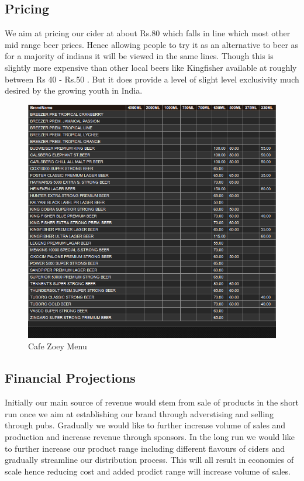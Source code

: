 \documentclass[11pt]{article}
\begin{document}
	\subsection{Pricing}
	We aim at pricing our cider at about Rs.80 which falls in line which most other mid range beer prices. Hence allowing people to try it as an alternative to beer as for a majority of indians it will be viewed in the same lines. Though this is slightly more expensive than other local beers like Kingfisher available at roughly between Rs 40 - Rs.50 . But it does provide a level of slight level exclusivity much desired by the growing youth in India.

	\begin{figure}[h!]
	\caption{Cafe Zoey Menu}
	\centering
	\includegraphics[width=\textwidth]{beerprices.png}
	\end{figure}
  \subsection{Financial Projections}
Initially our main source of revenue would stem from sale of products in the short run once we aim at establishing our brand through adverstising and selling through pubs. Gradually we would like to further increase volume of sales and production and increase revenue through sponsors. In the long run we would like to further increase our product range including different flavours of ciders and gradually streamline our distribution process. This will all result in economies of scale hence reducing cost and added prodict range will increase volume of sales.
\end{document}

